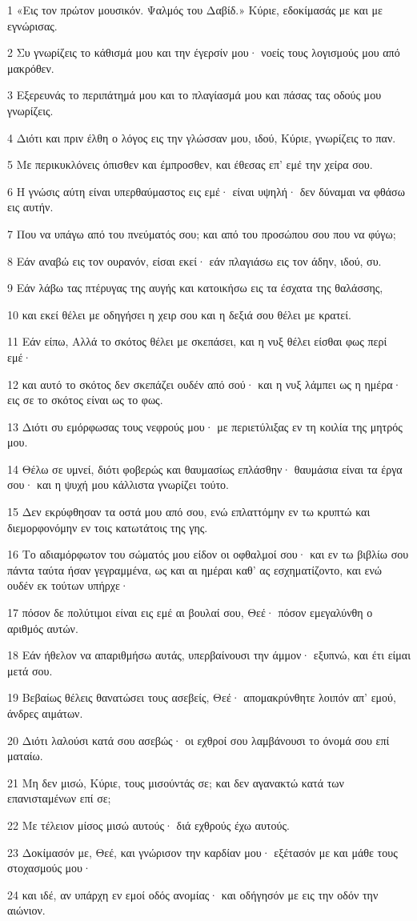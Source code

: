 \par 1 «Εις τον πρώτον μουσικόν. Ψαλμός του Δαβίδ.» Κύριε, εδοκίμασάς με και με εγνώρισας.
\par 2 Συ γνωρίζεις το κάθισμά μου και την έγερσίν μου· νοείς τους λογισμούς μου από μακρόθεν.
\par 3 Εξερευνάς το περιπάτημά μου και το πλαγίασμά μου και πάσας τας οδούς μου γνωρίζεις.
\par 4 Διότι και πριν έλθη ο λόγος εις την γλώσσαν μου, ιδού, Κύριε, γνωρίζεις το παν.
\par 5 Με περικυκλόνεις όπισθεν και έμπροσθεν, και έθεσας επ' εμέ την χείρα σου.
\par 6 Η γνώσις αύτη είναι υπερθαύμαστος εις εμέ· είναι υψηλή· δεν δύναμαι να φθάσω εις αυτήν.
\par 7 Που να υπάγω από του πνεύματός σου; και από του προσώπου σου που να φύγω;
\par 8 Εάν αναβώ εις τον ουρανόν, είσαι εκεί· εάν πλαγιάσω εις τον άδην, ιδού, συ.
\par 9 Εάν λάβω τας πτέρυγας της αυγής και κατοικήσω εις τα έσχατα της θαλάσσης,
\par 10 και εκεί θέλει με οδηγήσει η χειρ σου και η δεξιά σου θέλει με κρατεί.
\par 11 Εάν είπω, Αλλά το σκότος θέλει με σκεπάσει, και η νυξ θέλει είσθαι φως περί εμέ·
\par 12 και αυτό το σκότος δεν σκεπάζει ουδέν από σού· και η νυξ λάμπει ως η ημέρα· εις σε το σκότος είναι ως το φως.
\par 13 Διότι συ εμόρφωσας τους νεφρούς μου· με περιετύλιξας εν τη κοιλία της μητρός μου.
\par 14 Θέλω σε υμνεί, διότι φοβερώς και θαυμασίως επλάσθην· θαυμάσια είναι τα έργα σου· και η ψυχή μου κάλλιστα γνωρίζει τούτο.
\par 15 Δεν εκρύφθησαν τα οστά μου από σου, ενώ επλαττόμην εν τω κρυπτώ και διεμορφονόμην εν τοις κατωτάτοις της γης.
\par 16 Το αδιαμόρφωτον του σώματός μου είδον οι οφθαλμοί σου· και εν τω βιβλίω σου πάντα ταύτα ήσαν γεγραμμένα, ως και αι ημέραι καθ' ας εσχηματίζοντο, και ενώ ουδέν εκ τούτων υπήρχε·
\par 17 πόσον δε πολύτιμοι είναι εις εμέ αι βουλαί σου, Θεέ· πόσον εμεγαλύνθη ο αριθμός αυτών.
\par 18 Εάν ήθελον να απαριθμήσω αυτάς, υπερβαίνουσι την άμμον· εξυπνώ, και έτι είμαι μετά σου.
\par 19 Βεβαίως θέλεις θανατώσει τους ασεβείς, Θεέ· απομακρύνθητε λοιπόν απ' εμού, άνδρες αιμάτων.
\par 20 Διότι λαλούσι κατά σου ασεβώς· οι εχθροί σου λαμβάνουσι το όνομά σου επί ματαίω.
\par 21 Μη δεν μισώ, Κύριε, τους μισούντάς σε; και δεν αγανακτώ κατά των επανισταμένων επί σε;
\par 22 Με τέλειον μίσος μισώ αυτούς· διά εχθρούς έχω αυτούς.
\par 23 Δοκίμασόν με, Θεέ, και γνώρισον την καρδίαν μου· εξέτασόν με και μάθε τους στοχασμούς μου·
\par 24 και ιδέ, αν υπάρχη εν εμοί οδός ανομίας· και οδήγησόν με εις την οδόν την αιώνιον.

